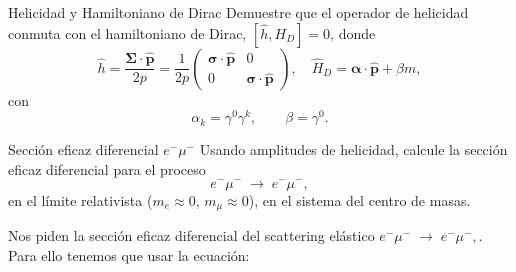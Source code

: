 \begin{Ejercicio}{Helicidad y Hamiltoniano de Dirac}
	Demuestre que el operador de helicidad conmuta con el hamiltoniano de Dirac, $[\hat{h},H_D]=0$, donde
	\[
		\hat{h} = \frac{\symbf{\Sigma}\cdot \hat{\mathbf{p}}}{2p}
		= \frac{1}{2p}\begin{pmatrix} \symbf{\sigma}\cdot\hat{\mathbf{p}} & 0 \\ 0 & \symbf{\sigma}\cdot\hat{\mathbf{p}} \end{pmatrix},
		\quad
		\hat{H}_D = \symbf{\alpha}\cdot\hat{\mathbf{p}} + \beta m,
	\]
	con
	\[
		\alpha_k = \gamma^0 \gamma^k, \qquad \beta = \gamma^0.
	\]
\end{Ejercicio}




\begin{Ejercicio}{Sección eficaz diferencial $e^-\mu^-$}\label{Ej:12}
	Usando amplitudes de helicidad, calcule la sección eficaz diferencial para el proceso
	\[
		e^- \mu^- \;\to\; e^- \mu^-,
	\]
	en el límite relativista ($m_e \approx 0$, $m_\mu \approx 0$), en el sistema del centro de masas.
\end{Ejercicio}

Nos piden la sección eficaz diferencial del scattering elástico $e^- \mu^- \;\to\; e^- \mu^-,$. Para ello tenemos que usar la ecuación:

